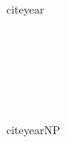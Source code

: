 \documentclass[a4paper, 12pt]{ltjarticle}
\begin{document}
citeyear

\citeyear{hanel1976properties} \\
\citeyear{nakajima1990} \\
\citeyear{nakajima2010a} \\

\citeyear{japanese1} \\
\citeyear{japanese2} \\
\citeyear{japanese3} \\

citeyearNP

 \\
 \\
 \\

 \\
 \\
 \\




\end{document}
